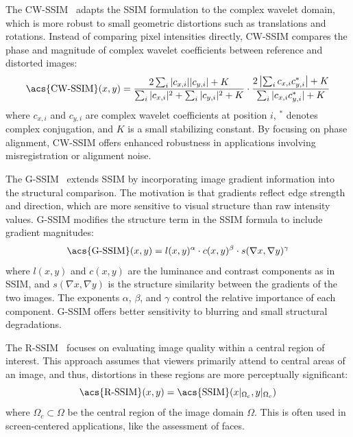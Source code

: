 The \acf{CW-SSIM}~\cite{sampat2009cwssim} adapts the \acs{SSIM} formulation to the complex wavelet domain, which is more robust to small geometric distortions such as translations and rotations. Instead of comparing pixel intensities directly, \acs{CW-SSIM} compares the phase and magnitude of complex wavelet coefficients between reference and distorted images:
\begin{equation}
\text{\acs{CW-SSIM}}(x, y) = \frac{2 \sum_{i} |c_{x,i}||c_{y,i}| + K}{\sum_{i} |c_{x,i}|^2 + \sum_{i} |c_{y,i}|^2 + K}
\cdot \frac{2 \left| \sum_{i} c_{x,i} c_{y,i}^* \right| + K}{\sum_{i} |c_{x,i} c_{y,i}^*| + K}
\end{equation}
where $c_{x,i}$ and $c_{y,i}$ are complex wavelet coefficients at position $i$, $^*$ denotes complex conjugation, and $K$ is a small stabilizing constant. By focusing on phase alignment, \acs{CW-SSIM} offers enhanced robustness in applications involving misregistration or alignment noise.

The \acf{G-SSIM}~\cite{chen2006gssim} extends \acs{SSIM} by incorporating image gradient information into the structural comparison. The motivation is that gradients reflect edge strength and direction, which are more sensitive to visual structure than raw intensity values. \acs{G-SSIM} modifies the structure term in the \acs{SSIM} formula to include gradient magnitudes:
\begin{equation}
\text{\acs{G-SSIM}}(x, y) = l(x, y)^\alpha \cdot c(x, y)^\beta \cdot s(\nabla x, \nabla y)^\gamma
\end{equation}
where $l(x, y)$ and $c(x, y)$ are the luminance and contrast components as in \acs{SSIM}, and $s(\nabla x, \nabla y)$ is the structure similarity between the gradients of the two images. The exponents $\alpha$, $\beta$, and $\gamma$ control the relative importance of each component. \acs{G-SSIM} offers better sensitivity to blurring and small structural degradations.

The \acf{R-SSIM}~\cite{yan2015rssim} focuses on evaluating image quality within a central region of interest. This approach assumes that viewers primarily attend to central areas of an image, and thus, distortions in these regions are more perceptually significant:
\begin{equation}
\text{\acs{R-SSIM}}(x, y) = \text{\acs{SSIM}}(x|_{\Omega_c}, y|_{\Omega_c})
\end{equation}
where $\Omega_c \subset \Omega$ be the central region of the image domain $\Omega$. This is often used in screen-centered applications, like the assessment of faces.

